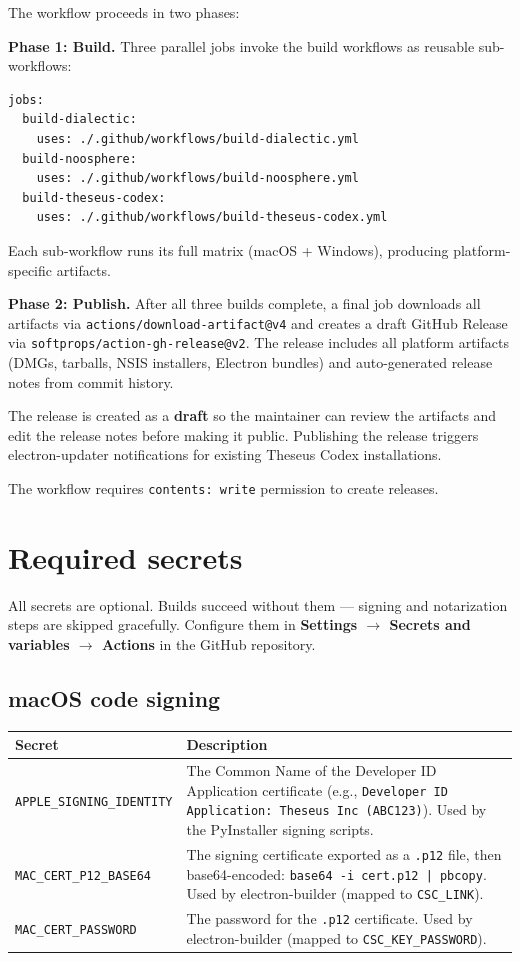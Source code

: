 \documentclass[11pt,letterpaper]{article}
\newcommand{\file}[1]{\texttt{#1}}
\newcommand{\cmd}[1]{\texttt{#1}}
\begin{document}
The workflow proceeds in two phases:

\textbf{Phase 1: Build.} Three parallel jobs invoke the build workflows as reusable sub-workflows:
\begin{lstlisting}
jobs:
  build-dialectic:
    uses: ./.github/workflows/build-dialectic.yml
  build-noosphere:
    uses: ./.github/workflows/build-noosphere.yml
  build-theseus-codex:
    uses: ./.github/workflows/build-theseus-codex.yml
\end{lstlisting}

Each sub-workflow runs its full matrix (macOS + Windows), producing platform-specific artifacts.

\textbf{Phase 2: Publish.} After all three builds complete, a final job downloads all artifacts via \cmd{actions/download-artifact@v4} and creates a draft GitHub Release via \cmd{softprops/action-gh-release@v2}. The release includes all platform artifacts (DMGs, tarballs, NSIS installers, Electron bundles) and auto-generated release notes from commit history.

The release is created as a \textbf{draft} so the maintainer can review the artifacts and edit the release notes before making it public. Publishing the release triggers electron-updater notifications for existing Theseus Codex installations.

The workflow requires \cmd{contents: write} permission to create releases.

\section{Required secrets}
\label{sec:secrets}

All secrets are optional. Builds succeed without them --- signing and notarization steps are skipped gracefully. Configure them in \textbf{Settings $\to$ Secrets and variables $\to$ Actions} in the GitHub repository.

\subsection{macOS code signing}

\begin{longtable}{p{4.5cm} p{10cm}}
\toprule
\textbf{Secret} & \textbf{Description} \\
\midrule
\endhead
\cmd{APPLE\_SIGNING\_IDENTITY} & The Common Name of the Developer ID Application certificate (e.g., \cmd{Developer ID Application: Theseus Inc (ABC123)}). Used by the PyInstaller signing scripts. \\
\cmd{MAC\_CERT\_P12\_BASE64} & The signing certificate exported as a \file{.p12} file, then base64-encoded: \cmd{base64 -i cert.p12 | pbcopy}. Used by electron-builder (mapped to \cmd{CSC\_LINK}). \\
\cmd{MAC\_CERT\_PASSWORD} & The password for the \file{.p12} certificate. Used by electron-builder (mapped to \cmd{CSC\_KEY\_PASSWORD}). \\
\bottomrule
\end{longtable}
\end{document}
